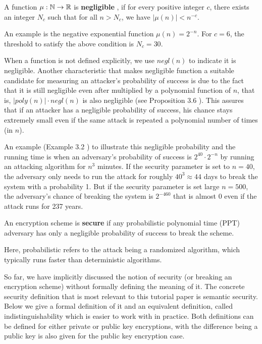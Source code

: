 \documentclass[../main.tex]{subfiles}
\begin{document}
\begin{definition}
	A function $\mu: \mathbb{N} \rightarrow \mathbb{R}$ is \textbf{negligible} , if for every positive integer $c$, there exists an integer $N_c$ such that for all $n > N_c$, we have $|\mu(n)| < n ^{-c}$.
\end{definition}
An example is the negative exponential function $\mu(n)=2^{-n}$. For $c=6$, the threshold to satisfy the above condition is $N_c=30$. 

When a function is not defined explicitly, we use $negl(n)$ to indicate it is negligible. Another characteristic that makes negligible function a suitable candidate for measuring an attacker's probability of success is due to the fact that it is still negligible even after multiplied by a polynomial function of $n$, that is, $|poly(n)| \cdot negl(n)$ is also negligible (see Proposition 3.6 \cite{katz2014introduction}). This assures that if an attacker has a negligible probability of success, his chance stays extremely small even if the same attack is repeated a polynomial number of times (in $n$). 

An example (Example 3.2 \cite{katz2014introduction}) to illustrate this negligible probability and the running time is when an adversary's probability of success is $2^{40} \cdot 2^{-n}$ by running an attacking algorithm for $n^3$ minutes. If the security parameter is set to $n=40$, the adversary only needs to run the attack for roughly $40^3 \approx 44$ days to break the system with a probability 1. But if the security parameter is set large $n=500$, the adversary's chance of breaking the system is $2^{-460}$ that is almost 0 even if the attack runs for 237 years. 

\begin{definition}
	An encryption scheme is \textbf{secure}  if any probabilistic polynomial time (PPT)  adversary has only a negligible probability of success to break the scheme. 
\end{definition}
Here, probabilistic refers to the attack being a randomized algorithm, which typically runs faster than deterministic algorithms.

So far, we have implicitly discussed the notion of security (or breaking an encryption scheme) without formally defining the meaning of it. The concrete security definition that is most relevant to this tutorial paper is semantic security.
Below we give a formal definition of it and an equivalent definition, called indistinguishability which is easier to work with in practice. Both definitions can be defined for either private or public key encryptions, with the difference being a public key is also given for the public key encryption case. 
\end{document}
